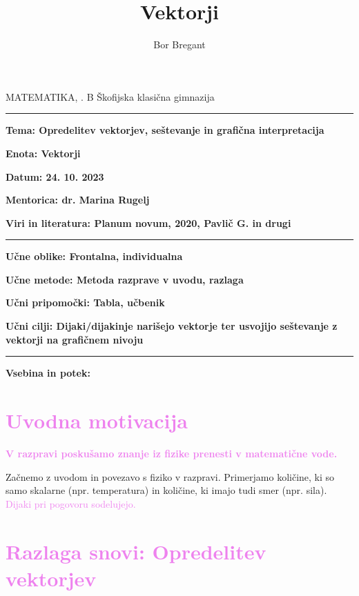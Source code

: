 \documentclass{article}
\title{Vektorji}
\author{Bor Bregant}
\date{\vspace{-5ex}}
\begin{document}
\thispagestyle{empty}	%

\noindent MATEMATIKA, . B \hfill Škofijska klasična gimnazija
\hrule
\vspace{1ex}
\noindent \textbf{Tema: Opredelitev vektorjev, seštevanje in grafična interpretacija}
\vspace{1ex}

\noindent \textbf{Enota: Vektorji}
\vspace{1ex}

\noindent \textbf{Datum: 24. 10. 2023}
\vspace{1ex}

\noindent \textbf{Mentorica: dr. Marina Rugelj}
\vspace{1ex}

\noindent \textbf{Viri in literatura: Planum novum, 2020, Pavlič G. in drugi}
\vspace{1ex}
\hrule
\vspace{2ex}
\noindent \textbf{Učne oblike: Frontalna, individualna}
\vspace{1ex}

\noindent \textbf{Učne metode: Metoda razprave v uvodu, razlaga}
\vspace{1ex}

\noindent \textbf{Učni pripomočki: Tabla, učbenik}
\vspace{1ex}

\noindent \textbf{Učni cilji: Dijaki/dijakinje narišejo vektorje ter usvojijo seštevanje z vektorji na grafičnem nivoju} 
\vspace{4ex}
\hrule
\vspace{5ex}
\noindent \textbf{Vsebina in potek:} 

\newpage

\section*{\textcolor{violet}{Uvodna motivacija}}

\textbf{\textcolor{violet}{V razpravi poskušamo znanje iz fizike prenesti v matematične vode.}}

Začnemo z uvodom in povezavo s fiziko v razpravi. Primerjamo količine, ki so samo skalarne (npr. temperatura) in količine, ki imajo tudi smer (npr. sila). \textcolor{violet}{Dijaki pri pogovoru sodelujejo.}


\section*{\textcolor{violet}{Razlaga snovi: Opredelitev vektorjev}}
\end{document}
